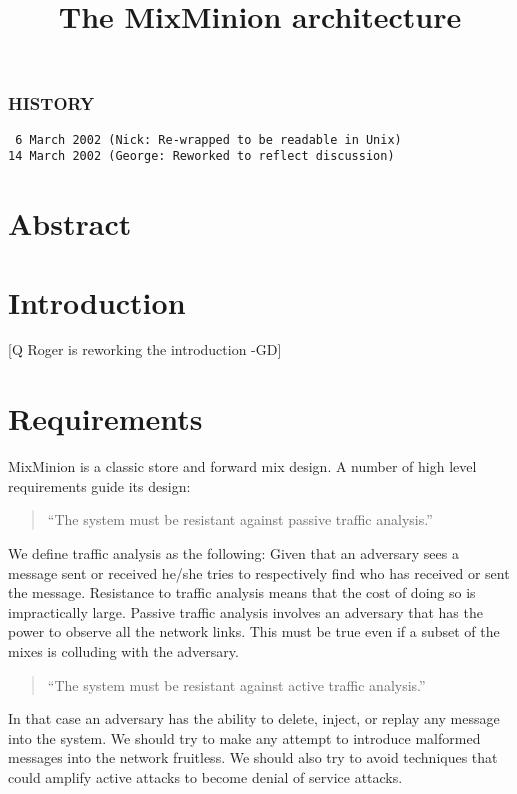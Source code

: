 \documentclass{article}
\begin{document}
\title{The MixMinion architecture}
\maketitle

\subsubsection{HISTORY}
\begin{verbatim}
 6 March 2002 (Nick: Re-wrapped to be readable in Unix)
14 March 2002 (George: Reworked to reflect discussion)
\end{verbatim}

\section{Abstract}
\section{Introduction}

[Q Roger is reworking the introduction -GD]

\section{Requirements}

MixMinion is a classic store and forward mix design. A number of high
level requirements guide its design:

\begin{quote}
     ``The system must be resistant against passive traffic analysis.''
\end{quote}

We define traffic analysis as the following: Given that an adversary
sees a message sent or received he/she tries to respectively find who
has received or sent the message. Resistance to traffic analysis means
that the cost of doing so is impractically large. Passive traffic
analysis involves an adversary that has the power to observe all the
network links. This must be true even if a subset of the mixes is
colluding with the adversary.

\begin{quote}
     ``The system must be resistant against active traffic analysis.''
\end{quote}

In that case an adversary has the ability to delete, inject, or replay 
any message into the system. We should try to make any attempt to
introduce malformed messages into the network fruitless. We should
also try to avoid techniques that could amplify active attacks to
become denial of service attacks.
\end{document}

